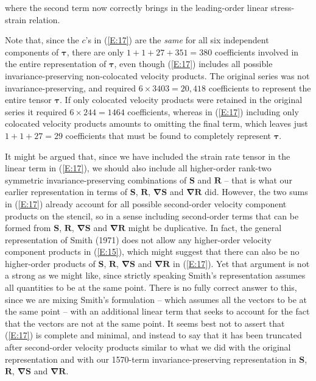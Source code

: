 where the second term now correctly brings in the leading-order linear stress-strain relation.

Note that, since the $c$'s in (\ref{E:17}) are the \textit{same} for all six independent components of $\mathbf{\tau}$, there are only $1 + 1 + 27 + 351 = 380$ coefficients involved in the entire representation of $\mathbf{\tau}$, even though (\ref{E:17}) includes all possible invariance-preserving non-colocated velocity products. The original  series was not invariance-preserving, and required  $6 \times 3403 = 20,418$ coefficients to represent the entire tensor $\mathbf{\tau}$. If only colocated velocity products were retained in the original  series it required $6 \times 244 = 1464$  coefficients, whereas in (\ref{E:17}) including only colocated velocity products amounts to omitting the final term, which leaves just $1 + 1 + 27 = 29$ coefficients that must be found to completely represent $\mathbf{\tau}$.

It might be argued that, since we have included the strain rate tensor in the linear term in (\ref{E:17}), we should also include all higher-order rank-two symmetric invariance-preserving combinations of $\mathbf{S}$ and $\mathbf{R}$ – that is what our earlier representation in terms of $\mathbf{S}$, $\mathbf{R}$, $\mathbf{\nabla S}$ and $\mathbf{\nabla R}$ did. However, the two sums in (\ref{E:17}) already account for all possible second-order velocity component products on the stencil, so in a sense including second-order terms that can be formed from $\mathbf{S}$, $\mathbf{R}$, $\mathbf{\nabla S}$ and $\mathbf{\nabla R}$ might be duplicative. In fact, the general representation of Smith (1971) does not allow any higher-order velocity component products in (\ref{E:15}), which might suggest that there can also be no higher-order products of $\mathbf{S}$, $\mathbf{R}$, $\mathbf{\nabla S}$ and $\mathbf{\nabla R}$ in (\ref{E:17}). Yet that argument is not a strong as we might like, since strictly speaking Smith’s representation assumes all quantities to be at the same point.  There is no fully correct answer to this, since we are mixing Smith’s formulation – which assumes all the vectors to be at the same point -- with an additional linear term that seeks to account for the fact that the vectors are not at the same point. It seems best not to assert that (\ref{E:17}) is complete and minimal, and instead to say that it has been truncated after second-order velocity products similar to what we did with the original  representation and with our 1570-term invariance-preserving representation in $\mathbf{S}$, $\mathbf{R}$, $\mathbf{\nabla S}$ and $\mathbf{\nabla R}$.

